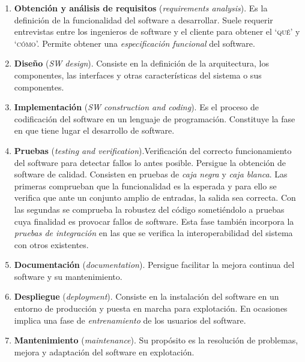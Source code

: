 \begin{enumerate}[1.-]
\item \textbf{Obtención y análisis de requisitos} (\emph{requirements analysis}). Es la definición de la funcionalidad del software a desarrollar. Suele requerir entrevistas entre los ingenieros de software y el cliente para obtener el `\textsc{qué}' y `\textsc{cómo}'. Permite obtener una \emph{especificación funcional} del software.

\item \textbf{Diseño} (\emph{SW design}). Consiste en la definición de la arquitectura, los componentes, las interfaces y otras características del sistema o sus componentes.

\item \textbf{Implementación} (\emph{SW construction and coding}). Es el proceso de codificación del software en un lenguaje de programación.  Constituye la fase en que tiene lugar el desarrollo de software.

\item \textbf{Pruebas} (\emph{testing and verification}).Verificación del correcto funcionamiento del software para detectar fallos lo antes posible. Persigue la obtención de software de calidad. Consisten en pruebas de \emph{caja negra} y \emph{caja blanca}. Las primeras comprueban que la funcionalidad es la esperada y para ello se verifica que ante un conjunto amplio de entradas, la salida sea correcta. Con las segundas se comprueba la robustez del código sometiéndolo a pruebas cuya finalidad es provocar fallos de software. Esta fase también incorpora la \emph{pruebas de integración} en las que se verifica la interoperabilidad del sistema con otros existentes.

\item \textbf{Documentación} (\emph{documentation}). Persigue facilitar la mejora continua del software y su mantenimiento.

\item \textbf{Despliegue} (\emph{deployment}). Consiste en la instalación del software en un entorno de producción y puesta en marcha para explotación. En ocasiones implica una fase de \emph{entrenamiento} de los usuarios del software.

\item \textbf{Mantenimiento} (\emph{maintenance}). Su propósito es la resolución de problemas, mejora y adaptación del software en explotación.
\end{enumerate}






